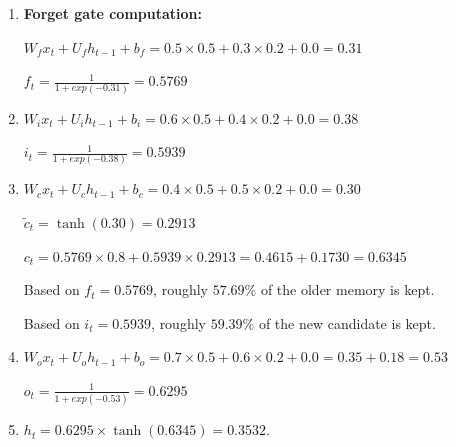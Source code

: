 \documentclass[12pt, xcolor=dvipsnames,svgnames,x11names]{article}
\begin{document}
\begin{enumerate}
\item \textbf{Forget gate computation:}

$W_f x_t + U_f h_{t-1} + b_f = 0.5\times 0.5 + 0.3 \times 0.2 + 0.0 = 0.31$

$f_t = \frac{1}{1+exp(-0.31)}  = 0.5769$

\item $W_i x_t + U_i h_{t-1} + b_i  = 0.6\times 0.5 + 0.4 \times 0.2 + 0.0 = 0.38$

$i_t = \frac{1}{1+exp(-0.38)}  = 0.5939$

  
\item 

$W_c x_t + U_c h_{t-1} + b_c = 0.4 \times 0.5 + 0.5 \times 0.2 + 0.0 = 0.30$


$\tilde{c}_t = \tanh(0.30)  = 0.2913$

$c_t = 0.5769\times 0.8 + 0.5939\times  0.2913 =  0.4615 + 0.1730 = 0.6345$

Based on $f_t  = 0.5769$, roughly $57.69\%$ of the older memory is kept.

Based on $i_t  = 0.5939$, roughly $59.39\%$ of the new candidate is kept.





\item 

$W_o x_t + U_o h_{t-1} + b_o = 0.7 \times 0.5 + 0.6\times 0.2 + 0.0 = 0.35 + 0.18 = 0.53$ 

$o_t = \frac{1}{1+exp(-0.53)}  = 0.6295$

\item 

$h_t  = 0.6295 \times  \tanh( 0.6345) = 0.3532$.

\end{enumerate}
\end{document}
